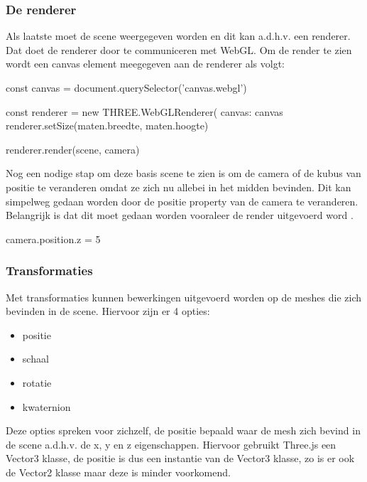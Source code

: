 \subsubsection{De renderer}

Als laatste moet de scene weergegeven worden en dit kan a.d.h.v. een renderer. Dat doet de renderer door te communiceren met WebGL. Om de render te zien wordt een canvas element meegegeven aan de renderer als volgt: 

\begin{LVerbatim}
const canvas = document.querySelector('canvas.webgl')

const renderer = new THREE.WebGLRenderer({
	canvas: canvas
}
renderer.setSize(maten.breedte, maten.hoogte)

renderer.render(scene, camera)
\end{LVerbatim}

Nog een nodige stap om deze basis scene te zien is om de camera of de kubus van positie te veranderen omdat ze zich nu allebei in het midden bevinden. Dit kan simpelweg gedaan worden door de positie property van de camera te veranderen. Belangrijk is dat dit moet gedaan worden vooraleer de render uitgevoerd word \autocite{Simon2023}.

\begin{LVerbatim}

camera.position.z = 5

\end{LVerbatim}

\subsubsection{Transformaties}

Met transformaties kunnen bewerkingen uitgevoerd worden op de meshes die zich bevinden in de scene. Hiervoor zijn er 4 opties: 

\begin{itemize}
	\item positie
	\item schaal
	\item rotatie
	\item kwaternion
\end{itemize}

Deze opties spreken voor zichzelf, de positie bepaald waar de mesh zich bevind in de scene a.d.h.v. de x, y en z eigenschappen. Hiervoor gebruikt Three.js een Vector3 klasse, de positie is dus een instantie van de Vector3 klasse, zo is er ook de Vector2 klasse maar deze is minder voorkomend.

